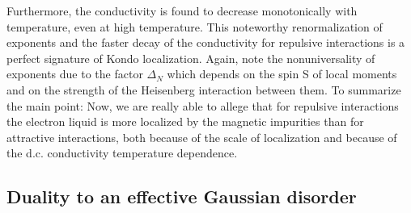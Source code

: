 Furthermore, 
the conductivity is found to
decrease monotonically with temperature, even at high temperature.
This noteworthy renormalization of exponents and the faster decay of the
conductivity for repulsive interactions 
is a perfect signature of Kondo localization. 
Again, note the nonuniversality of exponents due to the factor
$\Delta_N$ which depends on the spin S of local moments and
 on the strength of the
Heisenberg interaction between them.
\vskip 0.2cm
To summarize the main point: 
Now, we are really able to allege that for repulsive interactions
the electron liquid
is more localized by the magnetic impurities
than for attractive interactions, both
because of the scale of localization and because of the d.c. conductivity
temperature dependence.


\subsection{Duality to an effective Gaussian disorder}

